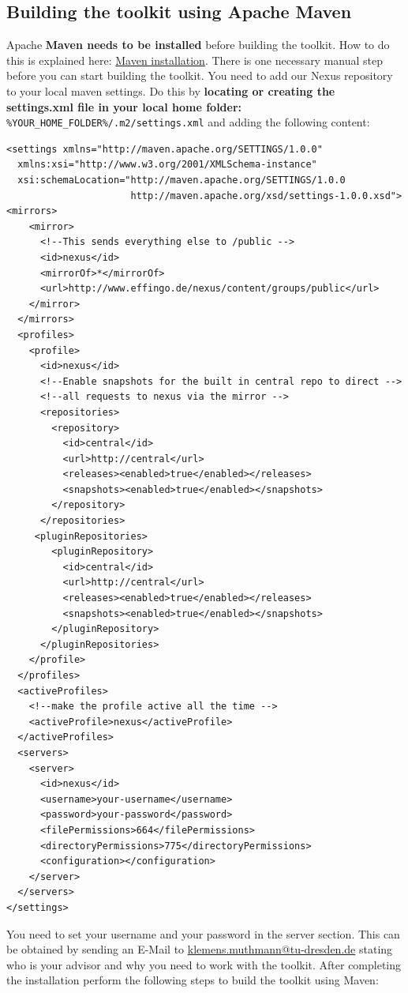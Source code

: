 \documentclass[a4paper,twoside]{article}      %
\begin{document}
\subsection{Building the toolkit using Apache Maven}
\label{sec:buildingthetoolkitusingapachemaven}
Apache \textbf{Maven needs to be installed} before building the toolkit. How to do this is explained here: \href{http://maven.apache.org/download.html#Installation}{Maven installation}. There is one necessary manual step before you can start building the toolkit. You need to add our Nexus repository to your local maven settings. Do this by \textbf{locating or creating the settings.xml file in your local home folder:} \texttt{\%YOUR\_HOME\_FOLDER\%/.m2/settings.xml} and adding the following content:
\begin{verbatim}
<settings xmlns="http://maven.apache.org/SETTINGS/1.0.0"
  xmlns:xsi="http://www.w3.org/2001/XMLSchema-instance"
  xsi:schemaLocation="http://maven.apache.org/SETTINGS/1.0.0
                      http://maven.apache.org/xsd/settings-1.0.0.xsd">
<mirrors>
    <mirror>
      <!--This sends everything else to /public -->
      <id>nexus</id>
      <mirrorOf>*</mirrorOf>
      <url>http://www.effingo.de/nexus/content/groups/public</url>
    </mirror>
  </mirrors>
  <profiles>
    <profile>
      <id>nexus</id>
      <!--Enable snapshots for the built in central repo to direct -->
      <!--all requests to nexus via the mirror -->
      <repositories>
        <repository>
          <id>central</id>
          <url>http://central</url>
          <releases><enabled>true</enabled></releases>
          <snapshots><enabled>true</enabled></snapshots>
        </repository>
      </repositories>
     <pluginRepositories>
        <pluginRepository>
          <id>central</id>
          <url>http://central</url>
          <releases><enabled>true</enabled></releases>
          <snapshots><enabled>true</enabled></snapshots>
        </pluginRepository>
      </pluginRepositories>
    </profile>
  </profiles>
  <activeProfiles>
    <!--make the profile active all the time -->
    <activeProfile>nexus</activeProfile>
  </activeProfiles>
  <servers>
    <server>
      <id>nexus</id>
      <username>your-username</username>
      <password>your-password</password>
      <filePermissions>664</filePermissions>
      <directoryPermissions>775</directoryPermissions>
      <configuration></configuration>
    </server>
  </servers>
</settings>
\end{verbatim}
You need to set your username and your password in the server section. This can be obtained by sending an E-Mail to \href{mailto:klemens.muthmann@tu-dresden.de}{klemens.muthmann@tu-dresden.de} stating who is your advisor and why you need to work with the toolkit. After completing the installation perform the following steps to build the toolkit using Maven:
\end{document}
